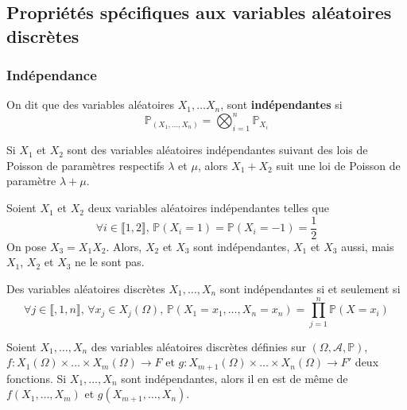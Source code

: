   \subsection{Propriétés spécifiques aux variables aléatoires discrètes}

  \subsubsection{Indépendance}


  \begin{definition}
    On dit que des variables aléatoires $X_1, \dots X_n$, sont \textbf{indépendantes} si
    \[ \mathbb{P}_{(X_1, \dots, X_n)} = \bigotimes_{i=1}^n \mathbb{P}_{X_i} \]
  \end{definition}


  \begin{example}
    Si $X_1$ et $X_2$ sont des variables aléatoires indépendantes suivant des lois de Poisson de paramètres respectifs $\lambda$ et $\mu$, alors $X_1 + X_2$ suit une loi de Poisson de paramètre $\lambda + \mu$.
  \end{example}

  \begin{cexample}
    Soient $X_1$ et $X_2$ deux variables aléatoires indépendantes telles que
    \[ \forall i \in \llbracket 1, 2 \rrbracket, \, \mathbb{P}(X_i = 1) = \mathbb{P}(X_i = -1) = \frac{1}{2} \]
    On pose $X_3 = X_1 X_2$. Alors, $X_2$ et $X_3$ sont indépendantes, $X_1$ et $X_3$ aussi, mais $X_1$, $X_2$ et $X_3$ ne le sont pas.
  \end{cexample}


  \begin{proposition}
    Des variables aléatoires discrètes $X_1, \dots, X_n$ sont indépendantes si et seulement si
    \[ \forall j \in \llbracket, 1, n \rrbracket, \, \forall x_j \in X_j(\Omega), \, \mathbb{P}(X_1 = x_1, \dots, X_n = x_n) = \prod_{j = 1}^n \mathbb{P}(X = x_i) \]
  \end{proposition}

  \begin{proposition}
    Soient $X_1, \dots, X_n$ des variables aléatoires discrètes définies sur $(\Omega, \mathcal{A}, \mathbb{P})$, $f : X_1(\Omega) \times \dots \times X_m(\Omega) \rightarrow F$ et $g : X_{m+1}(\Omega) \times \dots \times X_n(\Omega) \rightarrow F'$ deux fonctions. Si $X_1, \dots, X_n$ sont indépendantes, alors il en est de même de $f(X_1, \dots, X_m)$ et $g(X_{m+1}, \dots, X_n)$.
  \end{proposition}

